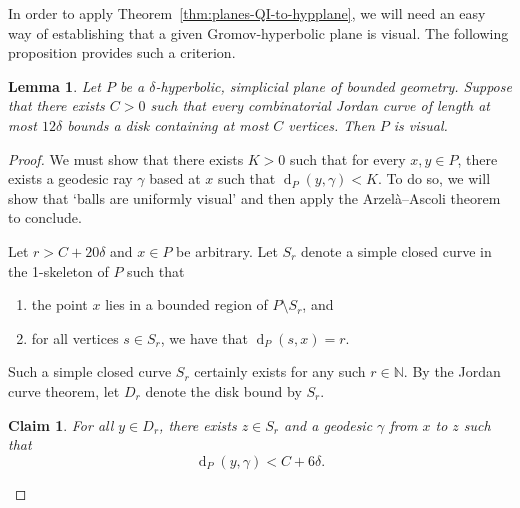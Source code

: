\documentclass[11pt,a4paper]{amsart}
\DeclareMathOperator{\dist}{d}
\newcommand{\N}{\mathbb{N}}
\newtheorem{lemma}[theorem]{Lemma}
\newtheorem{claim}[theorem]{Claim}
\theoremstyle{definition}
\begin{document}
In order to apply Theorem~\ref{thm:planes-QI-to-hypplane}, we will need an easy way of establishing that a given Gromov-hyperbolic plane is visual. The following proposition provides such a criterion. 

\begin{lemma}\label{prop:criterion-for-visibility}
	Let $P$ be a $\delta$-hyperbolic, simplicial plane of bounded geometry. Suppose that there exists $C > 0$ such that every combinatorial Jordan curve of length at most $12\delta$ bounds a disk containing at most $C$ vertices. Then $P$ is visual. 
\end{lemma}

\begin{proof}
    We must show that there exists $K > 0$ such that for every $x, y \in P$, there exists a geodesic ray $\gamma$ based at $x$ such that $\dist_P(y,\gamma) < K$. 
    To do so, we will show that `balls are uniformly visual' and then apply the Arzel\`a--Ascoli theorem to conclude. 
    
	Let $r > C + 20 \delta$ and $x \in P$ be arbitrary. Let $S_r$ denote a simple closed curve in the 1-skeleton of $P$ such that 
    \begin{enumerate}
        \item the point $x$ lies in a bounded region of $P \setminus S_r$, and 

		\item for all vertices $s \in S_r$, we have that $\dist_P(s,x) = r$. 
    \end{enumerate}
	Such a simple closed curve $S_r$ certainly exists for any such $r\in\N$. 
    By the Jordan curve theorem, let $D_r$ denote the disk bound by $S_r$.  

    \begin{claim}\label{claim:spheres-are-visual}
        For all $y \in D_r$, there exists $z \in S_r$ and a geodesic $\gamma$ from $x$ to $z$ such that 
        $$
        \dist_P(y,\gamma) < C + 6\delta. 
        $$
    \end{claim}


\end{proof}
\end{document}
